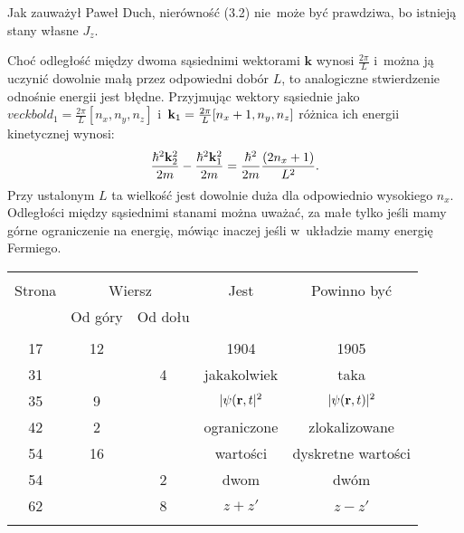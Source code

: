 \documentclass[a4paper,11pt]{article}
\begin{document}
\noindent
{} Jak zauważył Paweł Duch, nierówność (3.2)
nie~może być prawdziwa, bo istnieją stany własne $J_{ z }$.

\vspace{\spaceFour}



\noindent
{} Choć odległość między dwoma sąsiednimi
wektorami $\mathbf{k}$ wynosi $\frac{ 2 \pi }{ L }$ i~można ją
uczynić dowolnie małą przez odpowiedni dobór $L$, to analogiczne
stwierdzenie odnośnie energii jest błędne. Przyjmując wektory
sąsiednie jako
$veckbold_{ 1 } = \frac{ 2 \pi }{ L } [ n_{ x }, n_{ y }, n_{ z } ]$
i~$\mathbf{k}_{ 1 } = \frac{ 2 \pi }{ L } [ n_{ x } + 1, n_{ y }, n_{ z } ]$
różnica ich energii kinetycznej wynosi:
\begin{equation}
  \frac{ \hbar^{ 2 } \mathbf{k}_{ 2 }^{ 2 } }{ 2 m }
  - \frac{ \hbar^{ 2 } \mathbf{k}_{ 1 }^{ 2 } }{ 2 m }
  = \frac{ \hbar^{ 2 } }{ 2 m } \frac{ ( 2 n_{ x } + 1 ) }{ L^{ 2 } }.
\end{equation}
Przy ustalonym $L$ ta wielkość jest dowolnie duża dla odpowiednio
wysokiego $n_{ x }$. Odległości między sąsiednimi stanami można
uważać, za małe tylko jeśli mamy górne ograniczenie na energię,
mówiąc inaczej jeśli w~układzie mamy energię Fermiego.







\begin{center}

  \begin{tabular}{|c|c|c|c|c|}
    \hline
    & \multicolumn{2}{c|}{} & & \\
    Strona & \multicolumn{2}{c|}{Wiersz} & Jest
                              & Powinno być \\ \cline{2-3}
    & Od góry & Od dołu & & \\
    \hline
    & & & & \\
    17 & 12 & & 1904 & 1905 \\
    31 & & 4 & jakakolwiek & taka \\
    35 & 9 & & $| \psi( \mathbf{r}, t |^{ 2 }$ & $| \psi( \mathbf{r}, t ) |^{ 2 }$ \\
    42 & 2 & & ograniczone & zlokalizowane \\
    54 & 16 & & wartości & dyskretne wartości \\
    54 & & 2 & dwom & dwóm \\
    62 & & 8 & $z + z'$ & $z - z'$ \\
    & & & & \\
    \hline
  \end{tabular}

\end{center}
\end{document}
